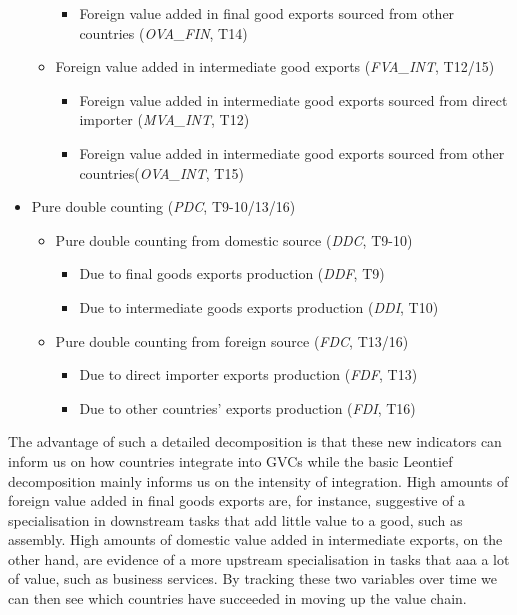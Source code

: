\documentclass[11pt,a4paper]{article}
\begin{document}
\begin{itemize}
\begin{itemize}
\begin{itemize}
\item Foreign value added in final good exports sourced from other countries (\textit{OVA\_FIN}, T14)
\end{itemize}
\item Foreign value added in intermediate good exports (\textit{FVA\_INT}, T12/15)
\begin{itemize}
\item Foreign value added in intermediate good exports sourced from direct importer (\textit{MVA\_INT}, T12)
\item Foreign value added in intermediate good exports sourced from other countries(\textit{OVA\_INT}, T15)
\end{itemize}
\end{itemize}
\item Pure double counting (\textit{PDC}, T9-10/13/16)
\begin{itemize}
\item Pure double counting from domestic source (\textit{DDC}, T9-10)
\begin{itemize}
\item Due to final goods exports production (\textit{DDF}, T9)
\item Due to intermediate goods exports production (\textit{DDI}, T10)
\end{itemize}
\item Pure double counting from foreign source (\textit{FDC}, T13/16)
\begin{itemize}
\item Due to direct importer exports production (\textit{FDF}, T13)
\item Due to other countries' exports production (\textit{FDI}, T16)
\end{itemize}
\end{itemize}
\end{itemize}

The advantage of such a detailed decomposition is that these new indicators can inform us on how countries integrate into GVCs while the basic Leontief decomposition mainly informs us on the intensity of integration. High amounts of foreign value added in final goods exports are, for instance, suggestive of a specialisation in downstream tasks that add little value to a good, such as assembly. High amounts of domestic value added in intermediate exports, on the other hand, are evidence of a more upstream specialisation in tasks that aaa a lot of value, such as business services. By tracking these two variables over time we can then see which countries have succeeded in moving up the value chain.
\end{document}

